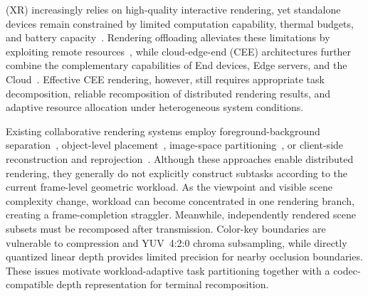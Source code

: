 \documentclass[10pt,journal,compsoc]{IEEEtran}
\begin{document}
\maketitle
\IEEEdisplaynontitleabstractindextext
\IEEEpeerreviewmaketitle


 (XR) increasingly relies on high-quality interactive rendering, yet standalone devices remain constrained by limited computation capability, thermal budgets, and battery capacity~\cite{lai_furion_2020,chen_you_2025}. Rendering offloading alleviates these limitations by exploiting remote resources~\cite{zhao_virtual_2021,huang_virtual_2023}, while cloud-edge-end (CEE) architectures further combine the complementary capabilities of End devices, Edge servers, and the Cloud~\cite{su_crossport_2026,li_toward_2024}. Effective CEE rendering, however, still requires appropriate task decomposition, reliable recomposition of distributed rendering results, and adaptive resource allocation under heterogeneous system conditions.

Existing collaborative rendering systems employ foreground-background separation~\cite{lai_furion_2020,meng_coterie_2020}, object-level placement~\cite{lu_renderfusion_2023}, image-space partitioning~\cite{corbillon_viewport-adaptive_2017,cantory_image-space_2023}, or client-side reconstruction and reprojection~\cite{ke_collabvr_2023,gao_xrgo_2025}. Although these approaches enable distributed rendering, they generally do not explicitly construct subtasks according to the current frame-level geometric workload. As the viewpoint and visible scene complexity change, workload can become concentrated in one rendering branch, creating a frame-completion straggler. Meanwhile, independently rendered scene subsets must be recomposed after transmission. Color-key boundaries are vulnerable to compression and YUV~4:2:0 chroma subsampling, while directly quantized linear depth provides limited precision for nearby occlusion boundaries. These issues motivate workload-adaptive task partitioning together with a codec-compatible depth representation for terminal recomposition.
\end{document}
